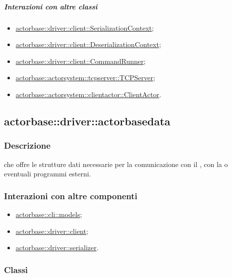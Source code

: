 \documentclass{scalatekids-article}
\begin{document}
\subparagraph{Interazioni con altre classi}
\begin{itemize}
\item \hyperref[sec:actorbase::driver::client::SerializationContext]{actorbase::driver::client::SerializationContext};
\item \hyperref[sec:actorbase::driver::client::Deserializationtext]{actorbase::driver::client::DeserializationContext};
\item \hyperref[sec:actorbase::driver::client::CommandRunner]{actorbase::driver::client::CommandRunner};
\item \hyperref[sec:actorbase::actorsystem::tcpserver::TCPServer]{actorbase::actorsystem::tcpserver::TCPServer};
\item \hyperref[sec:actorbase::actorbase::actorsystem::clientactor::ClientActor]{actorbase::actorsystem::clientactor::ClientActor}.
\end{itemize}

\subsection{actorbase::driver::actorbasedata}
\label{sec:actorbase::driver::actorbasedata}

\subsubsection{Descrizione}

 che offre le strutture dati necessarie per la comunicazione
con il , con la  o eventuali programmi esterni.

\subsubsection{Interazioni con altre componenti}
\begin{itemize}
\item \hyperref[sec:actorbase::cli::models]{actorbase::cli::models};
\item \hyperref[sec:actorbase::driver::client]{actorbase::driver::client};
\item \hyperref[sec:actorbase::driver::serializer]{actorbase::driver::serializer}.
\end{itemize}

\subsubsection{Classi}
\end{document}
